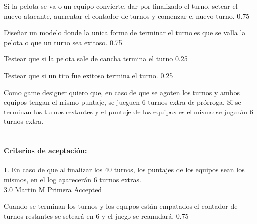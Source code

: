 		{Si la pelota se va o un equipo convierte, dar por finalizado el turno, setear el nuevo atacante, aumentar el contador de turnos y comenzar el nuevo turno.} %
		{} %
		{0.75} %
		{} %
		{} %
		{} %

		{Diseñar un modelo donde la unica forma de terminar el turno es que se valla la pelota o que un turno sea exitoso.} %
		{} %
		{0.75} %
		{} %
		{} %
		{} %

		{Testear que si la pelota sale de cancha termina el turno} %
		{} %
		{0.25} %
		{} %
		{} %
		{} %

		{Testear que si un tiro fue exitoso termina el turno.} %
		{} %
		{0.25} %
		{} %
		{} %
		{} %
\vspace{20pt}



	{Como game designer quiero que, en caso de que se agoten los turnos y ambos equipos tengan el mismo puntaje, se jueguen 6 turnos extra de pr\'orroga.} %
	{Si se terminan los turnos restantes y el puntaje de los equipos es el mismo se jugarán 6 turnos extra. \\
  \\
  \\
\textbf{Criterios de aceptación:}\\
  \\
1. En caso de que al finalizar los 40 turnos, los puntajes de los equipos sean los mismos, en el log aparecerán 6 turnos extras. \\
} %
	{} %
	{3.0} %
	{Martin M} %
	{Primera} %
	{Accepted} %

		{Cuando se terminan los turnos y los equipos están empatados el contador de turnos restantes se seteará en 6 y el juego se reanudará.} %
		{} %
		{0.75} %
		{} %
		{} %
		{} %

